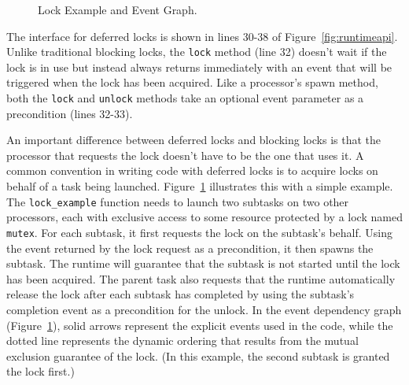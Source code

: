 \begin{figure}
{\begin{tikzpicture}



\end{tikzpicture}
}
\caption{Lock Example and Event Graph.\label{fig:lockevents}}
\vspace{-4mm}
\end{figure}

The interface for deferred locks is shown in lines 30-38 of Figure~\ref{fig:runtimeapi}.
Unlike traditional blocking locks, the {\tt lock} method (line 32) doesn't
wait if the lock is in use but instead always returns immediately with an event that will be triggered
when the lock has been acquired.  Like a processor's spawn method, both the {\tt lock} 
and {\tt unlock} methods take an optional event parameter as a precondition (lines 32-33).

An important difference between deferred locks and blocking locks is that the processor
that requests the lock doesn't have to be the one that uses it.  A common
convention in writing code with deferred locks is to acquire locks on behalf of a task being
launched.  Figure~\ref{fig:lockevents} illustrates this with a simple example.  The {\tt lock\_example}
function needs to launch two subtasks on two other processors, each with exclusive access to some resource protected by a
lock named {\tt mutex}.  For each subtask, it first requests the lock on the subtask's behalf.  Using the
event returned by the lock request as a precondition, it then spawns the subtask.  The runtime will guarantee
that the subtask is not started until the lock has been acquired.  The parent task also requests that the
runtime automatically release the lock after each subtask has completed by using the subtask's completion
event as a precondition for the unlock.  In the event dependency graph (Figure~\ref{fig:lockevents}),
solid arrows represent
the explicit events used in the code, while the dotted line represents the dynamic ordering that results
from the mutual exclusion guarantee of the lock.  (In this example, the second subtask is granted the lock first.)


